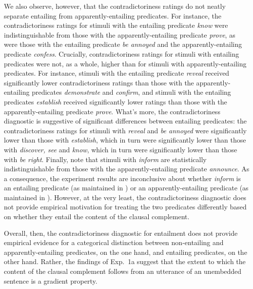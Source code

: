 \documentclass[11pt,fleqn]{article}
\newcommand{\6}{\mbox{$[\hspace*{-.6mm}[$}}
\newcommand{\9}{\mbox{$]\hspace*{-.6mm}]$}}
\begin{document}
We also observe, however, that the contradictoriness ratings do not neatly separate entailing from apparently-entailing predicates. For instance, the contradictoriness ratings for stimuli with the entailing predicate {\em know} were indistinguishable from those with the apparently-entailing predicate {\em prove}, as were those with the entailing predicate {\em be annoyed} and the apparently-entailing predicate {\em confess}. 
Crucially, contradictoriness ratings for stimuli with entailing predicates were not, as a whole, higher than for stimuli with apparently-entailing predicates. For instance, stimuli with the entailing predicate {\em reveal} received significantly lower contradictoriness ratings than those with the apparently-entailing predicates {\em demonstrate} and {\em confirm}, and stimuli with the entailing predicates {\em establish} received significantly lower ratings than those with the apparently-entailing predicate {\em prove}. What's more, the contradictoriness diagnostic is suggestive of significant differences between entailing predicates: the contradictoriness ratings for stimuli with {\em reveal} and {\em be annoyed} were significantly lower than those with {\em establish}, which in turn were significantly lower than those with {\em discover, see} and {\em know}, which in turn were significantly lower than those with {\em be right}. Finally, note that stimuli with {\em inform} are statistically indistinguishable from those with the apparently-entailing predicate {\em announce}. As a consequence, the experiment results are inconclusive about whether {\em inform} is an entailing predicate (as maintained in \citealt{schlenker10}) or an apparently-entailing predicate (as maintained in \citealt{anand-hacquard2014}). However, at the very least, the contradictoriness diagnostic does not provide empirical motivation for treating the two predicates differently based on whether they entail the content of the clausal complement.

Overall, then, the contradictoriness diagnostic for entailment does not provide empirical evidence for a categorical distinction between non-entailing and apparently-entailing predicates, on the one hand, and entailing predicates, on the other hand. Rather, the findings of Exp.~1a suggest that the extent to which the content of the clausal complement follows from an utterance of an unembedded sentence is a gradient property. 
\end{document}
